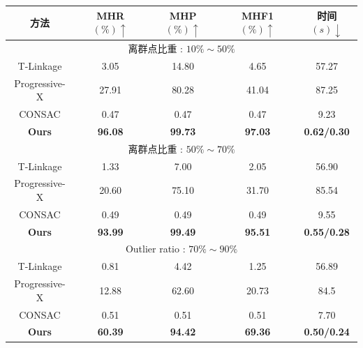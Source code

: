 \begin{table}[ht]
    \centering
\scriptsize
    \begin{tabular}{ccccc} %
        \toprule
        \textbf{方法}& MHR$\left( \% \right) \uparrow $ & MHP$\left( \% \right) \uparrow $ & MHF1$\left( \% \right) \uparrow $ & 时间$\left( s \right) \downarrow $\\
        \hline
        \multicolumn{5}{c}{离群点比重 : $10\%\sim50\%$} \\
        \hline
        T-Linkage & 3.05 & 14.80 & 4.65& 57.27 \\
        Progressive-X & 27.91 & 80.28 & 41.04 & 87.25\\
        CONSAC & 0.47 & 0.47 & 0.47 & 9.23  \\
        \textbf{Ours} & \textbf{96.08} & \textbf{99.73} & \textbf{97.03} & \textbf{0.62/0.30} \\ %
        \hline
        \multicolumn{5}{c}{离群点比重 : $50\%\sim70\%$} \\
        \hline
        T-Linkage & 1.33 & 7.00 & 2.05 & 56.90 \\
        Progressive-X & 20.60 & 75.10 & 31.70 & 85.54  \\
        CONSAC & 0.49 & 0.49 & 0.49 & 9.55\\
        \textbf{Ours} & \textbf{93.99} & \textbf{99.49} & \textbf{95.51} & \textbf{0.55/0.28}\\
        \hline
        
        \multicolumn{5}{c}{Outlier ratio : $70\%\sim90\%$} \\
        \hline
        T-Linkage & 0.81 & 4.42 & 1.25 & 56.89 \\
        Progressive-X & 12.88 & 62.60 & 20.73 & 84.5 \\
        CONSAC & 0.51 & 0.51 & 0.51 & 7.70  \\
        \textbf{Ours} & \textbf{60.39} & \textbf{94.42} & \textbf{69.36} &\textbf{0.50/0.24}\\


\end{tabular}
\end{table}
